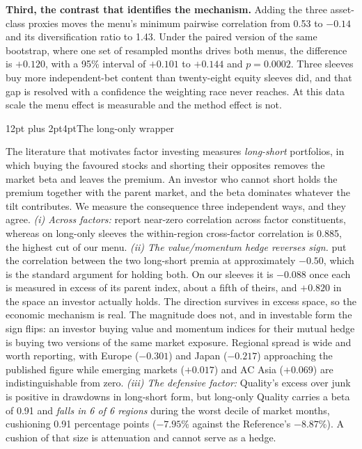 \documentclass[12pt,letterpaper]{article}
\makeatletter
\renewcommand{\subsection}{\@startsection{subsection}{2}{\parindent}%
  {12pt plus 2pt}{4pt}{\normalfont\bfseries}}
\newcommand{\head}[1]{\noindent\textbf{#1}\hspace{0.5em}\ignorespaces}
\makeatother
\begin{document}
\head{Third, the contrast that identifies the mechanism.} Adding the three
asset-class proxies moves the menu's minimum pairwise correlation from 0.53 to
$-0.14$ and its diversification ratio to 1.43. Under the paired version of the
same bootstrap, where one set of resampled months drives both menus, the
difference is $+0.120$, with a 95\% interval of $+0.101$ to $+0.144$ and $p = 0.0002$. Three sleeves buy more independent-bet content than twenty-eight
equity sleeves did, and that gap is resolved with a confidence the weighting race
never reaches. At this data scale the menu effect is measurable and the method effect is not.

\subsection{The long-only wrapper}

The literature that motivates factor investing measures \emph{long-short}
portfolios, in which buying the favoured stocks and shorting their opposites
removes the market beta and leaves the premium. An investor who cannot short holds
the premium together with the parent market, and the beta dominates whatever the
tilt contributes. We measure the consequence three independent ways, and they
agree. \emph{(i) Across factors:} \citet{ilmanen2012} report near-zero correlation
across factor constituents, whereas on long-only sleeves the within-region
cross-factor correlation is 0.885, the highest cut of our menu.
\emph{(ii) The value/momentum hedge reverses sign.} \citet{asness2013} put the correlation between the two long-short
premia at approximately $-0.50$, which is the standard argument for
holding both. On our sleeves it is $-0.088$ once each is measured in
excess of its parent index, about a fifth of theirs, and $+0.820$ in the
space an investor actually holds. The direction survives in excess space, so the
economic mechanism is real. The magnitude does not, and in investable form the
sign flips: an investor buying value and momentum indices for their mutual hedge
is buying two versions of the same market exposure. Regional spread is wide and
worth reporting, with Europe ($-0.301$) and Japan ($-0.217$) approaching the
published figure while emerging markets ($+0.017$) and AC Asia ($+0.069$) are
indistinguishable from zero. \emph{(iii) The defensive factor:} Quality's excess
over junk is positive in drawdowns in long-short form, but long-only Quality
carries a beta of 0.91 and \emph{falls in 6 of 6 regions} during the
worst decile of market months, cushioning 0.91 percentage points
($-7.95$\% against the Reference's $-8.87$\%). A cushion of that size is
attenuation and cannot serve as a hedge.
\end{document}
